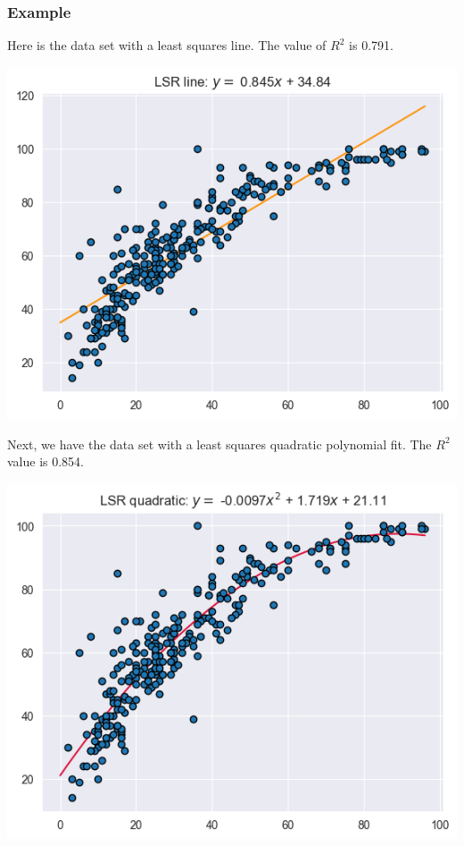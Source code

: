 \documentclass{beamer}
\theoremstyle{example}
\begin{document}
\begin{frame}
\frametitle{Example}
Here is the data set with a least squares line. The value of $R^2$ is 0.791. 
\begin{center}
    \includegraphics[height=0.35\textheight]{../../Images/CollegeTop25ontoTop10_deg1.png}
\end{center}

\pause 
Next, we have the data set with a least squares quadratic polynomial fit. The $R^2$ value is 0.854.

\begin{center}
    \includegraphics[height=0.35\textheight]{../../Images/CollegeTop25ontoTop10_deg2.png}
\end{center}
\end{frame}
\end{document}
